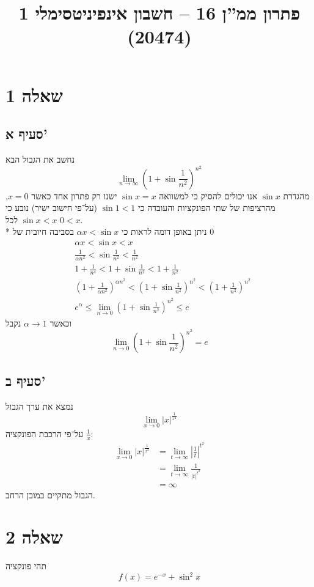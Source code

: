 
\title{פתרון ממ''ן 16 – חשבון אינפיניטסימלי 1 (20474)}


\maketitle
\section{שאלה 1}
\subsection{סעיף א'}
נחשב את הגבול הבא
\[
	\lim_{n \to \infty} {\left( 1 + \sin \frac{1}{n^2} \right)}^{n^2}
\]
מהגדרת $\sin x$ אנו יכולים להסיק כי למשוואה $\sin x = x$ ישנו רק פתרון אחד כאשר $x = 0$,
מהרציפות של שתי הפונקציות והעובדה כי $\sin 1 < 1$ (על־פי חישוב ישיר) נובע כי $\sin x < x$ לכל $0 < x$. \\*
ניתן באופן דומה לראות כי $\alpha x < \sin x$ בסביבה חיובית של $0$
\begin{align*}
	& \alpha x < \sin x < x \\
	& \frac{1}{\alpha n^2} < \sin \frac{1}{n^2} < \frac{1}{n^2} \\
	& 1 + \frac{1}{n^4} < 1 + \sin \frac{1}{n^2} < 1 + \frac{1}{n^2} \\
	& {\left( 1 + \frac{1}{\alpha n^2} \right)}^{\alpha n^2} < {\left( 1 + \sin \frac{1}{n^2} \right)}^{n^2} < {\left(1 + \frac{1}{n^2} \right)}^{n^2} \\
	& e^\alpha \le \lim_{n \to 0} {\left( 1 + \sin \frac{1}{n^2} \right)}^{n^2} \le e
\end{align*}
וכאשר $\alpha \to 1$ נקבל
\[
	\lim_{n \to 0} {\left( 1 + \sin \frac{1}{n^2} \right)}^{n^2} = e
\]

\subsection{סעיף ב'}
נמצא את ערך הגבול
\[
	\lim_{x \to 0} |x|^{\frac{1}{x^2}}
\]
על־פי הרכבת הפונקציה $\frac{1}{x}$:
\begin{align*}
	\lim_{x \to 0} |x|^{\frac{1}{x^2}}
	& = \lim_{t \to \infty} {\left\lvert \frac{1}{t} \right\rvert}^{t^2} \\
	& = \lim_{t \to \infty} \frac{1}{|t|^{t^2} } \\
	& = \infty
\end{align*}
הגבול מתקיים במובן הרחב.

\section{שאלה 2}
תהי פונקציה
\[
	f(x) = e^{-x} + \sin^2 x
\]

